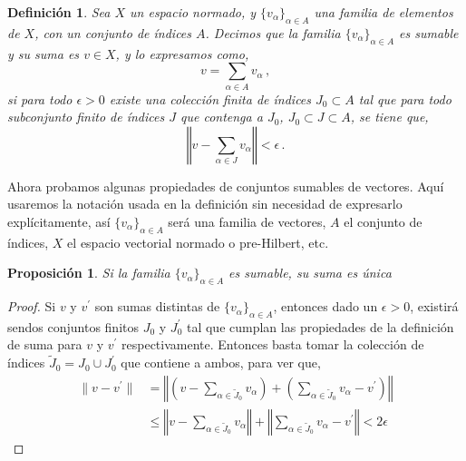 \documentclass[12pt]{book}
\newtheorem{defn}{\bf Definición}[chapter]
\newtheorem{prop}{\bf Proposición}[chapter]
\newcommand{\norm}[1]{\lVert #1\rVert }
\newcommand{\Norm}[1]{\left\Vert #1\right\Vert }
\begin{document}
 


 
\begin{defn} Sea  $X$ un espacio normado, y $\{v_\alpha\}_{\alpha\in A}$  una familia de  elementos de $X$,
 con un conjunto de índices $A$. Decimos  que la familia $\{v_\alpha\}_{\alpha\in A}$ es {\emph sumable} y su suma es $v\in X$, y lo expresamos como,
$$v=\sum_{\alpha\in A} v_\alpha\,,$$
si para todo $\epsilon>0$ existe una colección finita de índices $J_0\subset A$ tal que para todo subconjunto finito de índices $J$ que contenga a $J_0$, $J_0\subset J\subset A$, se tiene que,
$$\Norm{v-\sum_{\alpha \in J}  v_\alpha}<\epsilon\,.$$
\end{defn}

Ahora probamos algunas propiedades de conjuntos sumables de vectores. Aquí usaremos la notación usada en la definición sin necesidad de expresarlo explícitamente, así $\{v_\alpha\}_{\alpha\in A}$ será una familia de vectores, $A$  el conjunto de índices, $X$ el espacio vectorial normado o pre-Hilbert, etc.

\begin{prop} Si la familia $\{v_\alpha\}_{\alpha\in A}$ es sumable, su suma es  única
\end{prop}
\begin{proof}
 Si $v$ y $v^\prime$ son sumas distintas de $\{v_\alpha\}_{\alpha\in A}$, entonces dado un $\epsilon>0$, existirá sendos  conjuntos finitos $J_0$ y $J_0^\prime$ tal que cumplan las propiedades de la definición de suma para $v$ y $v^\prime$ respectivamente. Entonces basta tomar la colección de índices 
$\tilde{J}_0 =J_0\cup J^\prime_0$ que contiene a ambos, para ver que,
\begin{align*}
\norm{v-v^\prime} &=\Norm{\left(v-\sum_{\alpha\in \tilde{J}_0} v_\alpha\right) +\left( \sum_{\alpha\in \tilde{J}_0} v_\alpha - v^\prime\right)}\\
&\leq \Norm{v-\sum_{\alpha\in \tilde{J}_0} v_\alpha} +\Norm{ \sum_{\alpha\in \tilde{J}_0} v_\alpha - v^\prime} <2\epsilon
\end{align*}
\end{proof}
 
\end{document}
